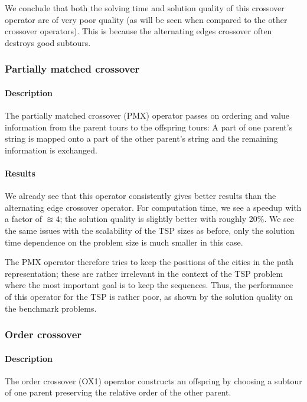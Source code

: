 \documentclass[a4paper,english,11pt,]{scrartcl}
\begin{document}
We conclude that both the solving time and solution quality of this crossover operator are of very poor quality (as will be seen when compared to the other crossover operators). This is because the alternating edges crossover often destroys good subtours. 




\subsubsection{Partially matched crossover}
\paragraph{Description}
The partially matched crossover (PMX) operator passes on ordering and value information
from the parent tours to the offspring tours: A part of one parent's string
is mapped onto a part of the other parent's string and the remaining
information is exchanged.

\paragraph{Results}
We already see that this operator consistently gives better results than the alternating edge crossover operator. For computation time, we see a speedup with a factor of $\approxeq 4$; the solution quality is slightly better with roughly 20\%. We see the same issues with the scalability of the TSP sizes as before, only the solution time dependence on the problem size is much smaller in this case. 

The PMX operator therefore tries to keep the positions of the cities in
the path representation; these are rather irrelevant in the context of the
TSP problem where the most important goal is to keep the sequences.
Thus, the performance of this operator for the TSP is rather poor, as shown by the solution quality on the benchmark problems.


% 
% 
\subsubsection{Order crossover}
\paragraph{Description}
The order crossover (OX1) operator constructs an offspring by choosing a subtour of one parent preserving
the relative order of the other parent. 
\end{document}
